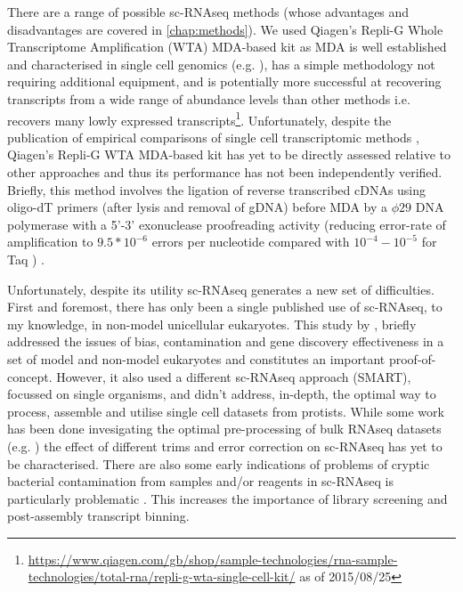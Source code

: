 There are a range of possible sc-RNAseq methods (whose advantages and disadvantages are covered in \ref{chap:methods}).
We used Qiagen's Repli-G Whole Transcriptome Amplification (WTA) MDA-based kit as MDA 
is well established and characterised in single cell genomics (e.g. \citep{Spits2006}), 
has a simple methodology not requiring additional equipment, and is potentially more successful at
recovering transcripts from a wide range of abundance levels than other methods i.e. recovers many lowly expressed transcripts\footnote{
\url{https://www.qiagen.com/gb/shop/sample-technologies/rna-sample-technologies/total-rna/repli-g-wta-single-cell-kit/} as of 2015/08/25}.
Unfortunately, despite the publication of empirical comparisons of single cell transcriptomic methods \citep{Wu2014a}, 
Qiagen's Repli-G WTA MDA-based kit has yet to be directly assessed relative to other approaches and thus its performance has not
been independently verified. 
Briefly, this method involves the ligation of reverse transcribed cDNAs using oligo-dT primers (after lysis and 
removal of gDNA) before MDA by a \(\phi29\) DNA polymerase with a 5'-3' exonuclease proofreading activity 
(reducing error-rate of amplification to \(9.5*10^{-6}\) errors per nucleotide \citep{Paez2004} compared with
\(10^{-4}-10^{-5}\) for Taq \citep{Tindall1988,Eckert1990}) \citep{Korfhage2015}.



Unfortunately, despite its utility sc-RNAseq generates a new set of difficulties.
First and foremost, there has only been a single published use of sc-RNAseq, to my knowledge, in non-model unicellular eukaryotes.   
This study by \citep{Kolisko2014}, briefly addressed the issues of bias, contamination and gene discovery effectiveness in a set of model and non-model eukaryotes and
constitutes an important proof-of-concept.  
However, it also used a different sc-RNAseq approach (SMART), focussed on single organisms, 
and didn't address, in-depth, the optimal way to process, assemble and utilise single cell datasets from protists.
While some work has been done invesigating the optimal pre-processing of bulk RNAseq datasets (e.g. \citep{Macmanes2013,Macmanes2015}) 
the effect of different trims and error correction on sc-RNAseq has yet to be characterised.  
There are also some early indications of problems of cryptic bacterial contamination
from samples and/or reagents in sc-RNAseq is particularly problematic \citep{Kolisko2014}. 
This increases the importance of library screening and post-assembly transcript binning.

